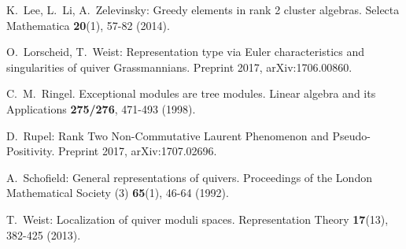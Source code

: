 \documentclass{amsart}
\numberwithin{equation}{section}
\begin{document}
\begin{thebibliography}{10}
  K.~Lee, L.~Li, A.~Zelevinsky: Greedy elements in rank 2 cluster algebras. Selecta Mathematica \textbf{20}(1), 57-82 (2014).

  O.~Lorscheid, T.~Weist: Representation type via Euler characteristics and singularities of quiver Grassmannians. Preprint 2017, arXiv:1706.00860.

  C.~M.~Ringel. Exceptional modules are tree modules. Linear algebra and its Applications \textbf{275/276}, 471-493 (1998).

  D.~Rupel: Rank Two Non-Commutative Laurent Phenomenon and Pseudo-Positivity. Preprint 2017, arXiv:1707.02696.

  A.~Schofield: General representations of quivers. Proceedings of the London Mathematical Society (3) \textbf{65}(1), 46-64 (1992).

  T.~Weist: Localization of quiver moduli spaces. Representation Theory \textbf{17}(13), 382-425 (2013).

\end{thebibliography}
\end{document}
